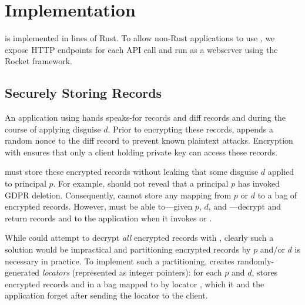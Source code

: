 \section{Implementation}

\sys is implemented in  lines of Rust. To allow non-Rust applications to use \sys, we
expose HTTP endpoints for each \sys API call and run \sys as a webserver using the Rocket framework.

\subsection{Securely Storing Records}
%
An application using \sys hands \sys speaks-for records  and diff records and 
during the course of applying disguise $d$.
%
Prior to encrypting these records, \sys appends a random nonce to the diff record to prevent known
plaintext attacks. Encryption with  ensures that only a client holding private key 
can access these records.

\sys must store these encrypted records without leaking that some disguise $d$ applied to principal
$p$.  For example, \sys should not reveal that a principal $p$ has invoked GDPR deletion.
%
Consequently, \sys cannot store any mapping from $p$ or $d$ to a bag of encrypted records.  However,
\sys must be able to---given $p$, $d$, and ---decrypt and return records  and
 to the application when it invokes  or .

While \sys could attempt to decrypt \emph{all} encrypted records with ,
clearly such a solution would be impractical and partitioning encrypted records by $p$ and/or $d$ is
necessary in practice.  To implement such a partitioning, \sys creates randomly-generated
\emph{locators}  (represented as integer pointers): for each $p$ and $d$, \sys stores
encrypted records  and  in a bag mapped to by  locator , which it and
the application forget after sending the locator to the client.


